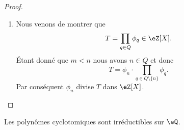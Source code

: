 \begin{proof}
\begin{enumerate}
        \item

            Nous venons de montrer que
            \begin{equation}
                T=\prod_{q\in Q}\phi_q\in \eZ[X].
            \end{equation}
            Étant donné que \( m<n\) nous avons \( n\in Q\) et donc
            \begin{equation}
                T=\phi_n\cdot\prod_{q\in Q\setminus\{ n \}}\phi_q.
            \end{equation}
            Par conséquent \( \phi_n\) divise \( T\) dans \( \eZ[X]\).
        \end{enumerate}
\end{proof}

\begin{proposition} \label{PropoIeOVh}
    Les polynômes cyclotomiques sont irréductibles sur \( \eQ\).
\end{proposition}

